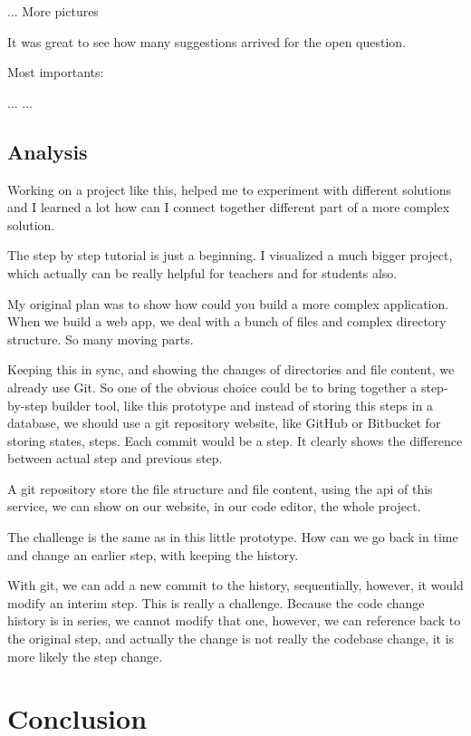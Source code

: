 \documentclass[12pt, a4paper, oneside, openright, medskipamount]{report}
\begin{document}
... More pictures

It was great to see how many suggestions arrived for the open question.

Most importants:

...
...




\section{Analysis}

Working on a project like this, helped me to experiment with different solutions and I learned a lot how can I connect together different part of a more complex solution.

The step by step tutorial is just a beginning. I visualized a much bigger project, which actually can be really helpful for teachers and for students also.

My original plan was to show how could you build a more complex application. When we build a web app, we deal with a bunch of files and complex directory structure. So many moving parts.

Keeping this in sync, and showing the changes of directories and file content, we already use Git. So one of the obvious choice could be to bring together a step-by-step builder tool, like this prototype and instead of storing this steps in a database, we should use a git repository website, like GitHub or Bitbucket for storing states, steps. Each commit would be a step. It clearly shows the difference between actual step and previous step.

A git repository store the file structure and file content, using the api of this service, we can show on our website, in our code editor, the whole project.

The challenge is the same as in this little prototype. How can we go back in time and change an earlier step, with keeping the history.

With git, we can add a new commit to the history, sequentially, however, it would modify an interim step. This is really a challenge. Because the code change history is in series, we cannot modify that one, however, we can reference back to the original step, and actually the change is not really the codebase change, it is more likely the step change.

\chapter{Conclusion}
\end{document}
